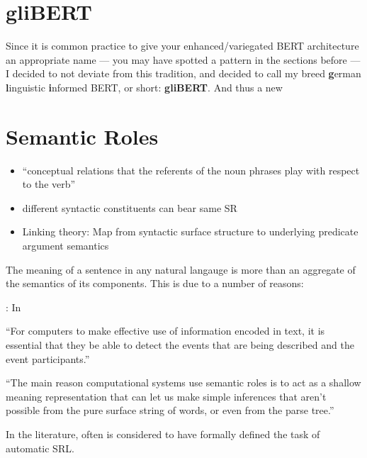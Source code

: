 \section{gliBERT}

Since it is common practice to give your enhanced/variegated BERT architecture an appropriate name --- you may have spotted
a pattern in the sections before --- I decided to not deviate from this tradition, and decided to call my breed
\textbf{g}erman \textbf{l}inguistic \textbf{i}nformed BERT, or short: \textbf{gliBERT}.
And thus a new


\section{Semantic Roles}


\begin{itemize}
  \item ``conceptual relations that the referents of the noun phrases play with respect to the verb'' \citep{palmer2010semantic}
  \item different syntactic constituents can bear same SR
  \item Linking theory: Map from syntactic surface structure to underlying predicate argument semantics
\end{itemize}

The meaning of a sentence in any natural langauge is more than an aggregate of the semantics
of its components. This is due to a number of reasons:

\begin{description}
  \item[\textbf{Fixed expressions}]: In
  \item
  \item
\end{description}

``For computers to make effective use of information encoded in text, it is essential that
they be able to detect the events that are being described and the event participants.''
\citep{palmer2010semantic}

``The main reason computational systems use semantic roles is to act as a shallow meaning
representation that can let us make simple inferences that aren’t possible from the pure surface
string of words, or even from the parse tree.'' \cite[p.~375]{jurafsky2019speech}

In the literature, often \cite{gildea2002automatic} is considered to have formally defined the
task of automatic SRL.

